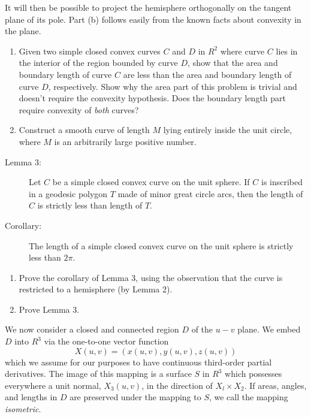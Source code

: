 \documentclass{book}
\begin{document}
It will then be possible to project the hemisphere orthogonally on the tangent plane of its pole. Part (b) follows easily from the known facts about convexity in the plane.

\begin{enumerate}
  \item[15.] Given two simple closed convex curves $C$ and $D$ in $R^{2}$ where curve $C$ lies in the interior of the region bounded by curve $D$, show that the area and boundary length of curve $C$ are less than the area and boundary length of curve $D$, respectively. Show why the area part of this problem is trivial and doesn't require the convexity hypothesis. Does the boundary length part require convexity of \emph{both} curves?
  \item[16.] Construct a smooth curve of length $M$ lying entirely inside the unit circle, where $M$ is an arbitrarily large positive number.
\end{enumerate}

\begin{description}
\item[Lemma 3:] Let $C$ be a simple closed convex curve on the unit sphere. If $C$ is inscribed in a geodesic polygon $T$ made of minor great circle arcs, then the length of $C$ is strictly less than length of $T$.

\item[Corollary:] The length of a simple closed convex curve on the unit sphere is strictly less than $2 \pi$.
\end{description}

\begin{enumerate}
  \item[17.] Prove the corollary of Lemma 3, using the observation that the curve is restricted to a hemisphere (by Lemma 2).
  \item[18.] Prove Lemma 3.
\end{enumerate}

We now consider a closed and connected region $D$ of the $u-v$ plane. We embed $D$ into $R^3$ via the one-to-one vector function
\begin{equation}
X(u,v) = ( x(u,v), y(u,v), z(u,v) )
\end{equation}
which we assume for our purposes to have continuous third-order partial derivatives. The image of this mapping is a surface $S$ in $R^{3}$ which possesses everywhere a unit normal, $X_{3}(u,v)$, in the direction of $X_{l} \times X_{2}$. If areas, angles, and lengths in $D$ are preserved under the mapping to $S$, we call the mapping \emph{isometric}.
\end{document}
